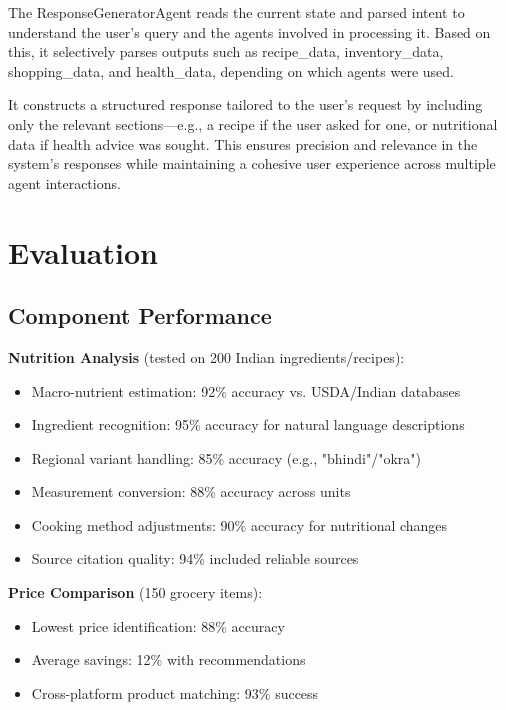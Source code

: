 \documentclass{ecai}
\begin{document}
The ResponseGeneratorAgent reads the current state and parsed intent to understand the user's query and the agents involved in processing it. Based on this, it selectively parses outputs such as recipe\_data, inventory\_data, shopping\_data, and health\_data, depending on which agents were used.

It constructs a structured response tailored to the user's request by including only the relevant sections—e.g., a recipe if the user asked for one, or nutritional data if health advice was sought. This ensures precision and relevance in the system's responses while maintaining a cohesive user experience across multiple agent interactions.

\section{Evaluation}

\subsection{Component Performance}

\textbf{Nutrition Analysis} (tested on 200 Indian ingredients/recipes):
\begin{itemize}[noitemsep,topsep=0pt]
    \item Macro-nutrient estimation: 92\% accuracy vs. USDA/Indian databases
    \item Ingredient recognition: 95\% accuracy for natural language descriptions
    \item Regional variant handling: 85\% accuracy (e.g., "bhindi"/"okra")
    \item Measurement conversion: 88\% accuracy across units
    \item Cooking method adjustments: 90\% accuracy for nutritional changes
    \item Source citation quality: 94\% included reliable sources
\end{itemize}

\textbf{Price Comparison} (150 grocery items):
\begin{itemize}[noitemsep,topsep=0pt]
    \item Lowest price identification: 88\% accuracy
    \item Average savings: 12\% with recommendations
    \item Cross-platform product matching: 93\% success
\end{itemize}
\end{document}
